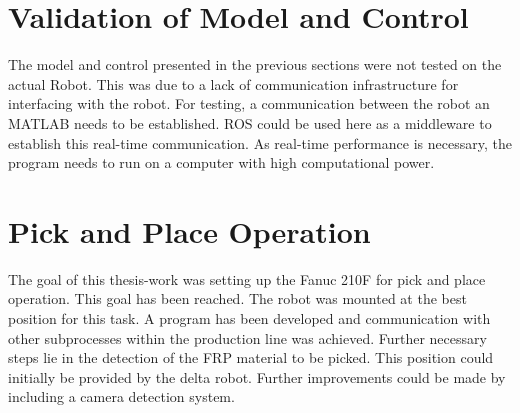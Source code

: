 \section{Validation of Model and Control}
The model and control presented in the previous sections were not tested on the actual Robot. This was due to a lack of communication infrastructure for interfacing with the robot. For testing, a communication between the robot an MATLAB needs to be established. \ac{ROS} could be used here as a middleware to establish this real-time communication. As real-time performance is necessary, the program needs to run on a computer with high computational power.\\

\section{Pick and Place Operation}
The goal of this thesis-work was setting up the Fanuc 210F for pick and place operation. This goal has been reached. The robot was mounted at the best position for this task. A program has been developed and communication with other subprocesses within the production line was achieved. 
Further necessary steps lie in the detection of the \ac{FRP} material to be picked. This position could initially be provided by the delta robot. Further improvements could be made by including a camera detection system.





